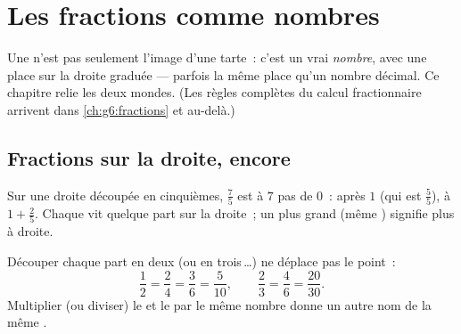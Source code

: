 \chapter{Les fractions comme nombres}\label{ch:g5:fractions}

Une  n'est pas seulement l'image d'une tarte~: c'est un
vrai \emph{nombre}, avec une place sur la droite graduée ---
parfois la même place qu'un nombre décimal. Ce chapitre relie les
deux mondes. (Les règles complètes du calcul fractionnaire arrivent
dans \cref{ch:g6:fractions} et au-delà.)

\section{Fractions sur la droite, encore}

\begin{example}\label{ex:g5:fractions:place}
Sur une droite découpée en cinquièmes, $\frac{7}{5}$ est à $7$ pas
de $0$~: après $1$ (qui est $\frac55$), à $1 + \frac25$. Chaque
 vit quelque part sur la droite~; un  plus grand
(même ) signifie plus à droite.
\end{example}

\begin{proposition}\label{prop:g5:fractions:equal}
Découper chaque part en deux (ou en trois\,\dots) ne déplace pas le
point~:
\[
\frac{1}{2} = \frac{2}{4} = \frac{3}{6} = \frac{5}{10},
\qquad
\frac{2}{3} = \frac{4}{6} = \frac{20}{30}.
\]
Multiplier (ou diviser) le  et le  par le
même nombre donne un autre nom de la même .
\end{proposition}
\admitted

